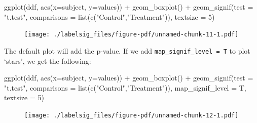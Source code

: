 \documentclass[
  letterpaper,
  DIV=11,
  numbers=noendperiod]{scrreprt}
\newenvironment{Shaded}{\begin{snugshade}}{\end{snugshade}}
\newcommand{\AttributeTok}[1]{\textcolor[rgb]{0.40,0.45,0.13}{#1}}
\newcommand{\DecValTok}[1]{\textcolor[rgb]{0.68,0.00,0.00}{#1}}
\newcommand{\FunctionTok}[1]{\textcolor[rgb]{0.28,0.35,0.67}{#1}}
\newcommand{\NormalTok}[1]{\textcolor[rgb]{0.00,0.23,0.31}{#1}}
\newcommand{\SpecialCharTok}[1]{\textcolor[rgb]{0.37,0.37,0.37}{#1}}
\newcommand{\StringTok}[1]{\textcolor[rgb]{0.13,0.47,0.30}{#1}}
\begin{document}
\begin{Shaded}
\begin{Highlighting}[]
\FunctionTok{ggplot}\NormalTok{(ddf, }\FunctionTok{aes}\NormalTok{(}\AttributeTok{x=}\NormalTok{subject, }\AttributeTok{y=}\NormalTok{values)) }\SpecialCharTok{+}
  \FunctionTok{geom\_boxplot}\NormalTok{() }\SpecialCharTok{+}
  \FunctionTok{geom\_signif}\NormalTok{(}\AttributeTok{test =} \StringTok{"t.test"}\NormalTok{, }
              \AttributeTok{comparisons =} \FunctionTok{list}\NormalTok{(}\FunctionTok{c}\NormalTok{(}\StringTok{"Control"}\NormalTok{,}\StringTok{"Treatment"}\NormalTok{)),}
              \AttributeTok{textsize =} \DecValTok{5}\NormalTok{)}
\end{Highlighting}
\end{Shaded}

\begin{figure}[H]

{\centering \texttt{[image: ./labelsig\_files/figure-pdf/unnamed-chunk-11-1.pdf]}

}

\end{figure}

The default plot will add the p-value. If we add
\texttt{map\_signif\_level\ =\ T} to plot `stars', we get the following:

\begin{Shaded}
\begin{Highlighting}[]
\FunctionTok{ggplot}\NormalTok{(ddf, }\FunctionTok{aes}\NormalTok{(}\AttributeTok{x=}\NormalTok{subject, }\AttributeTok{y=}\NormalTok{values)) }\SpecialCharTok{+}
  \FunctionTok{geom\_boxplot}\NormalTok{() }\SpecialCharTok{+}
  \FunctionTok{geom\_signif}\NormalTok{(}\AttributeTok{test =} \StringTok{"t.test"}\NormalTok{, }
              \AttributeTok{comparisons =} \FunctionTok{list}\NormalTok{(}\FunctionTok{c}\NormalTok{(}\StringTok{"Control"}\NormalTok{,}\StringTok{"Treatment"}\NormalTok{)),}
              \AttributeTok{map\_signif\_level =}\NormalTok{ T,}
              \AttributeTok{textsize =} \DecValTok{5}\NormalTok{)}
\end{Highlighting}
\end{Shaded}

\begin{figure}[H]

{\centering \texttt{[image: ./labelsig\_files/figure-pdf/unnamed-chunk-12-1.pdf]}

}

\end{figure}
\end{document}
